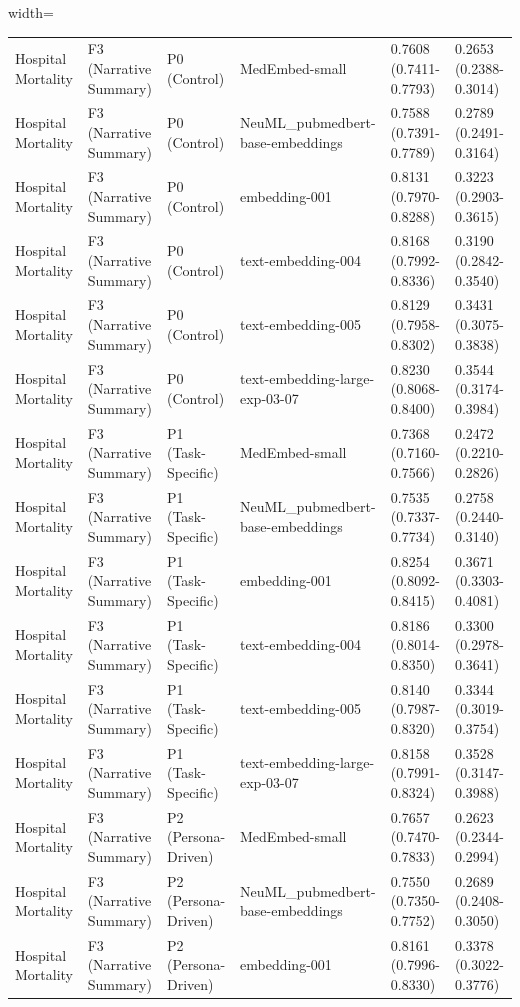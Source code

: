 \documentclass[border=0pt]{standalone}
\begin{document}
\begin{adjustbox}{width=\textwidth}
\begin{tabular}{llllll}
Hospital Mortality & F3 (Narrative Summary) & P0 (Control) & MedEmbed-small & 0.7608 (0.7411-0.7793) & 0.2653 (0.2388-0.3014) \\
Hospital Mortality & F3 (Narrative Summary) & P0 (Control) & NeuML\_pubmedbert-base-embeddings & 0.7588 (0.7391-0.7789) & 0.2789 (0.2491-0.3164) \\
Hospital Mortality & F3 (Narrative Summary) & P0 (Control) & embedding-001 & 0.8131 (0.7970-0.8288) & 0.3223 (0.2903-0.3615) \\
Hospital Mortality & F3 (Narrative Summary) & P0 (Control) & text-embedding-004 & 0.8168 (0.7992-0.8336) & 0.3190 (0.2842-0.3540) \\
Hospital Mortality & F3 (Narrative Summary) & P0 (Control) & text-embedding-005 & 0.8129 (0.7958-0.8302) & 0.3431 (0.3075-0.3838) \\
Hospital Mortality & F3 (Narrative Summary) & P0 (Control) & text-embedding-large-exp-03-07 & 0.8230 (0.8068-0.8400) & 0.3544 (0.3174-0.3984) \\
Hospital Mortality & F3 (Narrative Summary) & P1 (Task-Specific) & MedEmbed-small & 0.7368 (0.7160-0.7566) & 0.2472 (0.2210-0.2826) \\
Hospital Mortality & F3 (Narrative Summary) & P1 (Task-Specific) & NeuML\_pubmedbert-base-embeddings & 0.7535 (0.7337-0.7734) & 0.2758 (0.2440-0.3140) \\
Hospital Mortality & F3 (Narrative Summary) & P1 (Task-Specific) & embedding-001 & 0.8254 (0.8092-0.8415) & 0.3671 (0.3303-0.4081) \\
Hospital Mortality & F3 (Narrative Summary) & P1 (Task-Specific) & text-embedding-004 & 0.8186 (0.8014-0.8350) & 0.3300 (0.2978-0.3641) \\
Hospital Mortality & F3 (Narrative Summary) & P1 (Task-Specific) & text-embedding-005 & 0.8140 (0.7987-0.8320) & 0.3344 (0.3019-0.3754) \\
Hospital Mortality & F3 (Narrative Summary) & P1 (Task-Specific) & text-embedding-large-exp-03-07 & 0.8158 (0.7991-0.8324) & 0.3528 (0.3147-0.3988) \\
Hospital Mortality & F3 (Narrative Summary) & P2 (Persona-Driven) & MedEmbed-small & 0.7657 (0.7470-0.7833) & 0.2623 (0.2344-0.2994) \\
Hospital Mortality & F3 (Narrative Summary) & P2 (Persona-Driven) & NeuML\_pubmedbert-base-embeddings & 0.7550 (0.7350-0.7752) & 0.2689 (0.2408-0.3050) \\
Hospital Mortality & F3 (Narrative Summary) & P2 (Persona-Driven) & embedding-001 & 0.8161 (0.7996-0.8330) & 0.3378 (0.3022-0.3776) \\

\end{tabular}
\end{adjustbox}
\end{document}
